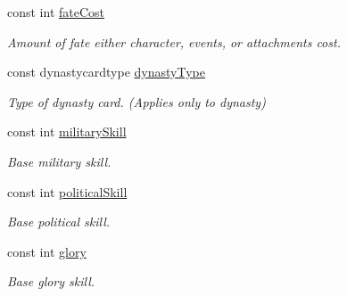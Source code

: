 \begin{DoxyCompactItemize}
\mbox{\label{classl5r_1_1CardData_a7777e76c6ba17fc434fe2f283782fe4d}} 
const int \hyperlink{classl5r_1_1CardData_a7777e76c6ba17fc434fe2f283782fe4d}{fate\+Cost}
\begin{DoxyCompactList}\small\item\em Amount of fate either character, events, or attachments cost. \end{DoxyCompactList}\item 
\mbox{\label{classl5r_1_1CardData_a5d95dc6177afae1bbcbbbf982b991e6d}} 
const dynastycardtype \hyperlink{classl5r_1_1CardData_a5d95dc6177afae1bbcbbbf982b991e6d}{dynasty\+Type}
\begin{DoxyCompactList}\small\item\em Type of dynasty card. (Applies only to dynasty) \end{DoxyCompactList}\item 
\mbox{\label{classl5r_1_1CardData_ab188c6df282db387cf9476163d363042}} 
const int \hyperlink{classl5r_1_1CardData_ab188c6df282db387cf9476163d363042}{military\+Skill}
\begin{DoxyCompactList}\small\item\em Base military skill. \end{DoxyCompactList}\item 
\mbox{\label{classl5r_1_1CardData_ac6febeb982d3779abd6a2dafff5a3acf}} 
const int \hyperlink{classl5r_1_1CardData_ac6febeb982d3779abd6a2dafff5a3acf}{political\+Skill}
\begin{DoxyCompactList}\small\item\em Base political skill. \end{DoxyCompactList}\item 
\mbox{\label{classl5r_1_1CardData_ac6f52dd080b87cf3093c91e2dac5c219}} 
const int \hyperlink{classl5r_1_1CardData_ac6f52dd080b87cf3093c91e2dac5c219}{glory}
\begin{DoxyCompactList}\small\item\em Base glory skill. \end{DoxyCompactList}\item 
\mbox{\label{classl5r_1_1CardData_a0c30e25824e693585a7b38569412eaa6}} 

\end{DoxyCompactItemize}
